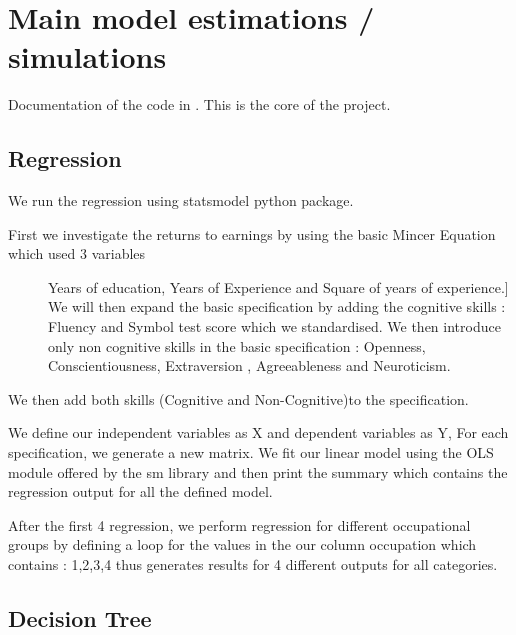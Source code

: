 \documentclass[a4paper,11pt,english]{sphinxmanual}
\begin{document}
\chapter{Main model estimations / simulations}
\label{\detokenize{analysis:main-model-estimations-simulations}}\label{\detokenize{analysis:analysis}}\label{\detokenize{analysis::doc}}
Documentation of the code in . This is the core of the project.


\section{Regression}
\label{\detokenize{analysis:module-src.analysis.reg_tree}}\label{\detokenize{analysis:regression}}
We run the regression using statsmodel python package.
\begin{description}
\item[{First we investigate the returns to earnings by  using the basic Mincer Equation which used 3 variables}] \leavevmode{[}Years of education, Years of Experience and Square of years of experience.{]}
We will then expand the basic specification by adding the cognitive skills : Fluency and Symbol test score which we standardised.
We then introduce only non cognitive skills in the basic specification : Openness, Conscientiousness, Extraversion , Agreeableness and Neuroticism.

\end{description}

We then add both skills (Cognitive and Non-Cognitive)to the specification.

We define our independent variables as X and dependent variables as Y, For each specification, we generate a new matrix. We fit our linear model using the OLS module offered by the sm library and then print the summary which contains the regression output for all the defined model.

After the first 4 regression, we perform regression for different occupational groups by defining a loop for the values in the our column occupation which contains : 1,2,3,4 thus generates results for 4 different outputs for all categories.


\section{Decision Tree}
\label{\detokenize{analysis:decision-tree}}
\end{document}
